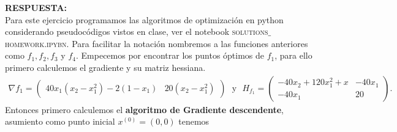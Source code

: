 \documentclass[11pt,letterpaper]{article}
\newcommand{\res}{\textbf{RESPUESTA:}\\}
\begin{document}
\begin{enumerate}
\res Para este ejercicio programamos las algoritmos de optimización en python considerando pseudocódigos vistos en clase, ver el notebook \textsc{solutions$\_$homework.ipybn}. Para facilitar la notación nombremos a las funciones anteriores como $f_1, f_2, f_3$ y $f_4$. Empecemos por encontrar los puntos óptimos de $f_1$, para ello primero calculemos el gradiente y su matriz hessiana.
\begin{align*}
\nabla f_1 =\begin{pmatrix}40x_1(x_2-x_1^2)-2(1-x_1)& 20(x_2-x_1^2)
\end{pmatrix} \ \ \ \text{y}\ \ \ H_{f_1}=\begin{pmatrix}
-40x_2+120x_1^2+x & -40x_1\\
-40x_1&20
\end{pmatrix}.
\end{align*}
Entonces primero calculemos el \textbf{algoritmo de Gradiente descendente}, asumiento como punto inicial $x^{(0)}=(0,0)$ tenemos 
\end{enumerate}
\end{document}
